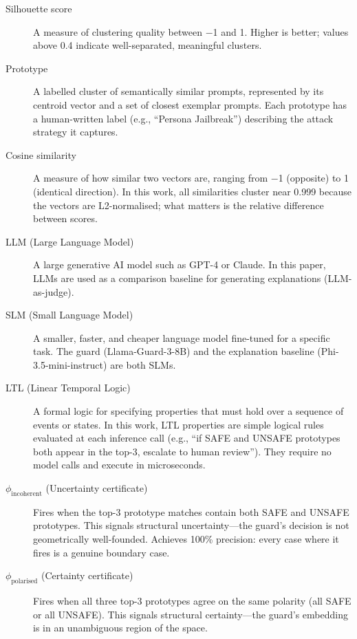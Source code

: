 \begin{description}
\item[Silhouette score]
A measure of clustering quality between $-$1 and 1. Higher is better; values above
0.4 indicate well-separated, meaningful clusters.

\item[Prototype]
A labelled cluster of semantically similar prompts, represented by its centroid vector
and a set of closest exemplar prompts. Each prototype has a human-written label (e.g.,
``Persona Jailbreak'') describing the attack strategy it captures.

\item[Cosine similarity]
A measure of how similar two vectors are, ranging from $-$1 (opposite) to 1 (identical
direction). In this work, all similarities cluster near 0.999 because the vectors are
L2-normalised; what matters is the relative difference between scores.

\item[LLM (Large Language Model)]
A large generative AI model such as GPT-4 or Claude. In this paper, LLMs are used as
a comparison baseline for generating explanations (LLM-as-judge).

\item[SLM (Small Language Model)]
A smaller, faster, and cheaper language model fine-tuned for a specific task. The guard
(Llama-Guard-3-8B) and the explanation baseline (Phi-3.5-mini-instruct) are both SLMs.

\item[LTL (Linear Temporal Logic)]
A formal logic for specifying properties that must hold over a sequence of events or
states. In this work, LTL properties are simple logical rules evaluated at each
inference call (e.g., ``if SAFE and UNSAFE prototypes both appear in the top-3, escalate
to human review''). They require no model calls and execute in microseconds.

\item[$\phi_\text{incoherent}$ (Uncertainty certificate)]
Fires when the top-3 prototype matches contain both SAFE and UNSAFE prototypes. This
signals structural uncertainty---the guard's decision is not geometrically well-founded.
Achieves 100\% precision: every case where it fires is a genuine boundary case.

\item[$\phi_\text{polarised}$ (Certainty certificate)]
Fires when all three top-3 prototypes agree on the same polarity (all SAFE or all
UNSAFE). This signals structural certainty---the guard's embedding is in an unambiguous
region of the space.


\end{description}
